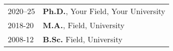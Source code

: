 

\renewcommand{\thefootnote}{\fnsymbol{footnote}}
\setcounter{footnote}{0}

\begin{longtable}[l]{@{}p{} p{}}
    2020--25\footnotemark & \textbf{Ph.D.}, Your Field, Your University \\

    2018-20 & \textbf{M.A.}, Field, University \\

    2008-12 & \textbf{B.Sc.} Field, University
\end{longtable}



\renewcommand{\thefootnote}{\arabic{footnote}}
\setcounter{footnote}{1}
